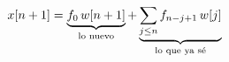 \documentclass[preview]{standalone}
\begin{document}
\begin{align*}
\special{dvisvgm:raw <g id='unique000'>}x[n+1]= \special{dvisvgm:raw </g>}\special{dvisvgm:raw <g id='unique001'>}\underbrace{f_0\,w[n+1]}_{\text{lo nuevo}} \special{dvisvgm:raw </g>}\special{dvisvgm:raw <g id='unique002'>}+ \special{dvisvgm:raw </g>}\special{dvisvgm:raw <g id='unique003'>}\underbrace{\sum_{j\le n} f_{n-j+1}\,w[j]}_{\text{lo que ya sé}}\special{dvisvgm:raw </g>}
\end{align*}
\end{document}
